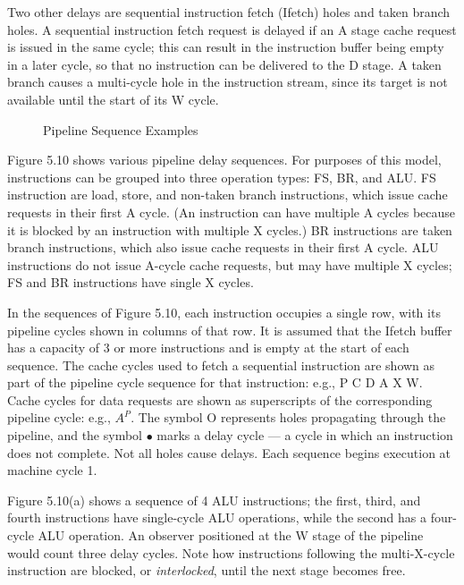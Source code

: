 Two other delays are sequential instruction fetch (Ifetch) holes and
taken branch holes. A sequential instruction fetch request is delayed if an A
stage cache request is issued in the same cycle; this can result in the instruction
buffer being empty in a later cycle, so that no instruction can be delivered
to the D stage. A taken branch causes a multi-cycle hole in the instruction
stream, since its target is not available until the start of its W cycle.



\begin{figure}[H]
\centering
\resizebox{!}{.84\textheight}{}
\caption{Pipeline Sequence Examples}
\end{figure}
Figure 5.10 shows various pipeline delay sequences. For purposes of this
model, instructions can be grouped into three operation types: FS, BR, and
ALU. FS instruction are load, store, and non-taken branch instructions, which
issue cache requests in their first A cycle. (An instruction can have multiple
A cycles because it is blocked by an instruction with multiple X cycles.) BR
instructions are taken branch instructions, which also issue cache requests in
their first A cycle. ALU instructions do not issue A-cycle cache requests, but
may have multiple X cycles; FS and BR instructions have single X cycles.

In the sequences of Figure 5.10, each instruction occupies a single row,
with its pipeline cycles shown in columns of that row. It is assumed that the
Ifetch buffer has a capacity of 3 or more instructions and is empty at the start
of each sequence. The cache cycles used to fetch a sequential instruction are
shown as part of the pipeline cycle sequence for that instruction: e.g.,
P C D A X W. Cache cycles for data requests are shown as superscripts of
the corresponding pipeline cycle: e.g., $A^P$. The symbol O represents holes
propagating through the pipeline, and the symbol $\bullet$ marks a delay cycle ---
a cycle in which an instruction does not complete. Not all holes cause delays.
Each sequence begins execution at machine cycle 1.

Figure 5.10(a) shows a sequence of 4 ALU instructions; the first, third,
and fourth instructions have single-cycle ALU operations, while the second
has a four-cycle ALU operation. An observer positioned at the W stage of
the pipeline would count three delay cycles. Note how instructions following
the multi-X-cycle instruction are blocked, or \emph{interlocked}, until the next
stage becomes free.


